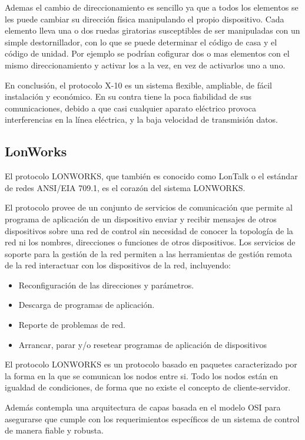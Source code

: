 Ademas el cambio de direccionamiento es sencillo ya que a todos los elementos se les puede cambiar su dirección física manipulando el propio dispositivo. Cada elemento lleva una o dos ruedas giratorias susceptibles de ser manipuladas con un simple destornillador, con lo que se puede determinar el código de casa y el código de unidad. Por ejemplo se podrían cofigurar dos o mas elementos con el mismo direccionamiento y activar los a la vez, en vez de activarlos uno a uno.


En conclusión, el protocolo X-10 es un sistema flexible, ampliable, de f\'acil instalación y económico. En su contra tiene la poca fiabilidad de sus comunicaciones, debido a que casi cualquier aparato eléctrico provoca interferencias en la línea eléctrica, y la baja velocidad de transmisión datos.
\clearpage
\subsection{LonWorks}
El protocolo LONWORKS, que también es conocido como LonTalk o el est\'andar de redes ANSI/EIA 709.1, es el corazón del sistema LONWORKS.


El protocolo provee de un conjunto de servicios de comunicación que permite al programa de aplicación de un dispositivo enviar y recibir mensajes de otros dispositivos sobre una red de control sin necesidad de conocer la topología de la red ni los nombres, direcciones o funciones de otros dispositivos. Los servicios de soporte para la gestión de la red permiten a las herramientas de gestión remota de la red interactuar con los dispositivos de la red, incluyendo:
\begin{itemize}
	\item Reconfiguración de las direcciones y par\'ametros.
	\item Descarga de programas de aplicación.
	\item Reporte de problemas de red.
	\item Arrancar, parar y/o resetear programas de aplicación de dispositivos
	\end{itemize}

El protocolo LONWORKS es un protocolo basado en paquetes caracterizado por la forma en la que se comunican los nodos entre si. Todo los nodos est\'an en igualdad de condiciones, de forma que no existe el concepto de cliente-servidor.



Adem\'as contempla una arquitectura de capas basada en el modelo OSI para asegurarse que cumple con los requerimientos específicos de un sistema de control de manera fiable y robusta.


